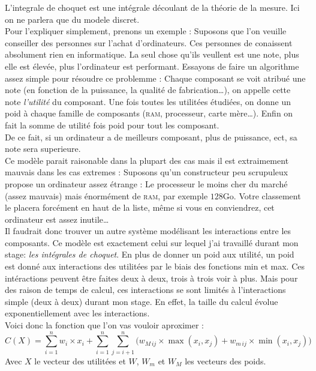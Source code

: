 
L'integrale de choquet est une intégrale découlant de la théorie de la mesure\cite{artch}.
Ici on ne parlera que du modele discret.\\


Pour l'expliquer simplement, prenons un exemple :
Suposons que l'on veuille conseiller des personnes sur l'achat d'ordinateurs.
Ces personnes de conaissent absolument rien en informatique.
La seul chose qu'ils veullent est une note, plus elle est élevée, plus l'ordinateur est performant.
Essayons de faire un algorithme assez simple pour résoudre ce problemme :
Chaque composant se voit atribué une note (en fonction de la puissance, la qualité de fabrication\ldots),
on appelle cette note \textit{l'utilité} du composant.
Une fois toutes les utilitées étudiées, on donne un poid à chaque famille de composants
(\textsc{ram}, processeur, carte mère\ldots).
Enfin on fait la somme de utilité fois poid pour tout les composant.\\
De ce fait, si un ordinateur a de meilleurs composant, plus de puissance, ect, sa note sera superieure.\\


Ce modèle parait raisonable dans la plupart des cas mais il est extraimement mauvais dans les cas extremes :
Suposons qu'un constructeur peu scrupuleux propose un ordinateur assez étrange :
Le processeur le moins cher du marché (assez mauvais) mais énormément de \textsc{ram}, par exemple $128$Go.
Votre classement le placera forcément en haut de la liste, même si vous en conviendrez,
cet ordinateur est assez inutile\ldots\\


Il faudrait donc trouver un autre système modélisant les interactions entre les composants.
Ce modèle est exactement celui sur lequel j'ai travaillé durant mon stage: \textit{les intégrales de choquet}.
En plus de donner un poid aux utilité,
un poid est donné aux interactions des utilitées par le biais des fonctions min et max.
Ces intéractions peuvent être faites deux à deux, trois à trois voir à plus.
Mais pour des raison de temps de calcul, ces interactions se sont limités à l'interactions simple
(deux à deux) durant mon stage.
En effet, la taille du calcul évolue exponentiellement avec les interactions.\\


Voici donc la fonction que l'on vas vouloir aproximer :
\begin{equation}
    \label{eq:choquet}
    C(X)  =
    \sum_{i=1}^{n}
        w_i \times x_i +
    \sum_{i=1}^{n}\sum_{j=i+1}^{n}
    \Big(
        w_{M\,ij} \times \max(x_i,x_j) + w_{m\,ij} \times \min(x_i,x_j)
    \Big)
\end{equation}
Avec $X$ le vecteur des utilitées et $W$, $W_m$ et $W_M$ les vecteurs des poids.
